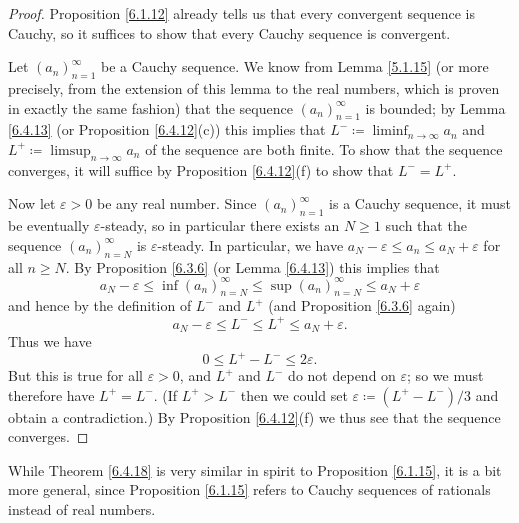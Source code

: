 \begin{proof}
    Proposition \ref{6.1.12} already tells us that every convergent sequence is Cauchy, so it suffices to show that every Cauchy sequence is convergent.

    Let \((a_n)_{n = 1}^\infty\) be a Cauchy sequence.
    We know from Lemma \ref{5.1.15} (or more precisely, from the extension of this lemma to the real numbers, which is proven in exactly the same fashion) that the sequence \((a_n)_{n = 1}^\infty\) is bounded;
    by Lemma \ref{6.4.13} (or Proposition \ref{6.4.12}(c)) this implies that \(L^- \coloneqq \liminf_{n \to \infty} a_n\) and \(L^+ \coloneqq \limsup_{n \to \infty} a_n\) of the sequence are both finite.
    To show that the sequence converges, it will suffice by Proposition \ref{6.4.12}(f) to show that \(L^- = L^+\).

    Now let \(\varepsilon > 0\) be any real number.
    Since \((a_n)_{n = 1}^\infty\) is a Cauchy sequence, it must be eventually \(\varepsilon\)-steady, so in particular there exists an \(N \geq 1\) such that the sequence \((a_n)_{n = N}^\infty\) is \(\varepsilon\)-steady.
    In particular, we have \(a_N - \varepsilon \leq a_n \leq a_N + \varepsilon\) for all \(n \geq N\).
    By Proposition \ref{6.3.6} (or Lemma \ref{6.4.13}) this implies that
    \[
        a_N - \varepsilon \leq \inf(a_n)_{n = N}^\infty \leq \sup(a_n)_{n = N}^\infty \leq a_N + \varepsilon
    \]
    and hence by the definition of \(L^-\) and \(L^+\) (and Proposition \ref{6.3.6} again)
    \[
        a_N - \varepsilon \leq L^- \leq L^+ \leq a_N + \varepsilon.
    \]
    Thus we have
    \[
        0 \leq L^+ - L^- \leq 2\varepsilon.
    \]
    But this is true for all \(\varepsilon > 0\), and \(L^+\) and \(L^-\) do not depend on \(\varepsilon\);
    so we must therefore have \(L^+ = L^-\).
    (If \(L^+ > L^-\) then we could set \(\varepsilon \coloneqq (L^+ - L^-) / 3\) and obtain a contradiction.)
    By Proposition \ref{6.4.12}(f) we thus see that the sequence converges.
\end{proof}

\begin{remark}\label{6.4.19}
    While Theorem \ref{6.4.18} is very similar in spirit to Proposition \ref{6.1.15}, it is a bit more general, since Proposition \ref{6.1.15} refers to Cauchy sequences of rationals instead of real numbers.
\end{remark}

